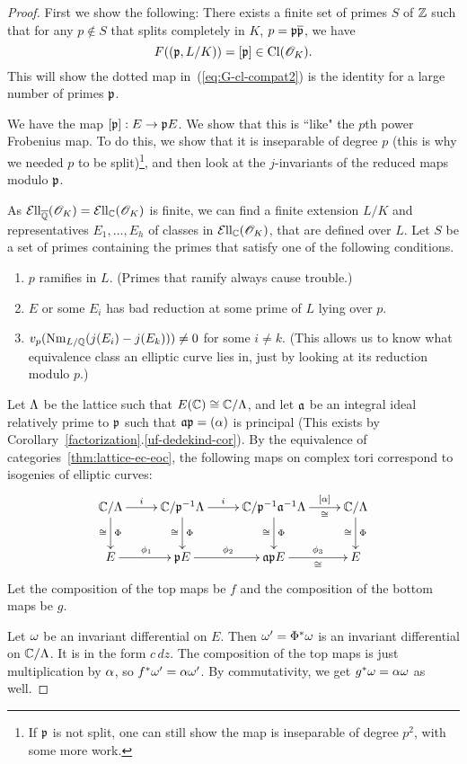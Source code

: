 \begin{proof}
First we show the following: There exists a finite set of primes $S$ of $\mathbb{Z}$ such that for any $p\nin S$ that splits completely in $K$, $p=\mathfrak{p}\overline{\mathfrak{p}}$, we have
\[
F((\mathfrak{p},L/K))=[\mathfrak{p}]\in \operatorname{Cl}(\mathscr{O}_K).
\]
This will show the dotted map in~(\ref{eq:G-cl-compat2}) is the identity for a large number of primes $\mathfrak{p}$.

We have the map $[\mathfrak{p}]:E\to \mathfrak{p} E$. We show that this is ``like" the $p$th power Frobenius map. To do this, we show that it is inseparable of degree $p$ (this is why we needed $p$ to be split)\footnote{If $\mathfrak{p}$ is not split, one can still show the map is inseparable of degree $p^2$, with some more work.}, %
and then look at the $j$-invariants of the reduced maps modulo $\mathfrak{p}$.

As $\mathcal{E}{\rm{ll}}_{\overline{\mathbb{Q}}}(\mathscr{O}_K)=\mathcal{E}{\rm{ll}}_{\mathbb{C}}(\mathscr{O}_K)$ is finite, we can find a finite extension $L/K$ and representatives $E_1,\ldots, E_h$ of classes in $\mathcal{E}{\rm{ll}}_{\mathbb{C}}(\mathscr{O}_K)$, that are defined over $L$. Let $S$ be a set of primes containing the primes that satisfy one of the following conditions.
\begin{enumerate}
\item
$p$ ramifies in $L$. (Primes that ramify always cause trouble.)
\item
$E$ or some $E_i$ has bad reduction at some prime of $L$ lying over $p$.
\item
$v_p(\operatorname{Nm}_{L/\mathbb{Q}}(j(E_i)-j(E_k)))\ne 0$ for some $i\ne k$. (This allows us to know what equivalence class an elliptic curve lies in, just by looking at its reduction modulo $p$.)
\end{enumerate}
Let $\Lambda$ be the lattice such that $E(\mathbb{C})\cong \mathbb{C}/\Lambda$, and let $\mathfrak{a}$ be an integral ideal relatively prime to $\mathfrak{p}$ such that $\mathfrak{a}\mathfrak{p}=(\alpha)$ is principal (This exists by Corollary~\ref{factorization}.\ref{uf-dedekind-cor}). By the equivalence of categories~\ref{thm:lattice-ec-eoc}, the following maps on complex tori correspond to isogenies of elliptic curves:
\[
\xymatrix{
\C/\La \ar[r]^-i \ar[d]^{\Phi}_{\cong} &
\C/\mfp^{-1}\La \ar[r]^-i \ar[d]^{\Phi}_{\cong} &
\C/\mfp^{-1}\ma^{-1}\La \ar[r]^-{[\al]}_-{\cong} \ar[d]^{\Phi}_{\cong}&
\C/\La \ar[d]^{\Phi}_{\cong}\\
E\ar[r]^{\phi_1}&
\mfp E\ar[r]^{\phi_2}&
\ma \mfp E\ar[r]^-{\phi_3}_-{\cong}&
E
}
\]
Let the composition of the top maps be $f$ and the composition of the bottom maps be $g$.

Let $\omega$ be an invariant differential on $E$. Then $\omega'=\Phi^*\omega$ is an invariant differential on $\mathbb{C}/\Lambda$. It is in the form $c\,dz$. The composition of the top maps is just multiplication by $\alpha$, so $f^*\omega'=\alpha\omega'$. By commutativity, we get $g^*\omega=\alpha\omega$ as well.


\end{proof}
